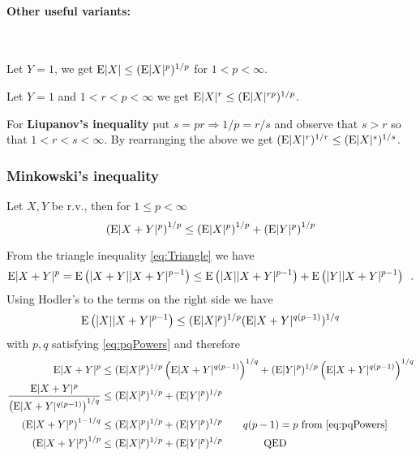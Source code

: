 \paragraph{Other useful variants:} \

Let $Y = 1$, we get $\mathrm{E} |X| \leq (\mathrm{E} |X|^p)^{1/p}$ for $1 < p < \infty$.

Let $Y = 1$ and $1 < r < p < \infty$ we get $\mathrm{E} |X|^r \leq (\mathrm{E} |X|^{rp})^{1/p}$.

For \textbf{Liupanov's inequality} put
$s = pr \Rightarrow 1/p = r/s$ and observe that $s > r$ so that
$1 < r < s < \infty$.
By rearranging the above we get $(\mathrm{E} |X|^r)^{1/r} \leq (\mathrm{E} |X|^{s})^{1/s}$.

\subsubsection{Minkowski's inequality}\label{sec:Minkowski}

Let $X, Y$ be r.v., then for $1 \leq p < \infty$
\begin{equation}\label{eq:Minkowski}
\left(\mathrm{E} |X+Y|^p\right)^{1/p} \leq \left(\mathrm{E} |X|^p\right)^{1/p} + \left(\mathrm{E} |Y|^p\right)^{1/p}
\end{equation}

\begin{prf}
From the triangle inequality \eqref{eq:Triangle} we have
\begin{equation*}
\mathrm{E} |X+Y|^p = \mathrm{E}\left(|X+Y| |X+Y|^{p-1}\right) \leq \mathrm{E}\left(|X| |X+Y|^{p-1}\right) + \mathrm{E}\left(|Y| |X+Y|^{p-1}\right) \enspace .
\end{equation*}
Using Hodler's to the terms on the right side we have
\begin{equation*}
\mathrm{E}\left(|X| |X+Y|^{p-1}\right) \leq (\mathrm{E} |X|^p)^{1/p} (\mathrm{E} |X+Y|^{q(p-1)})^{1/q}
\end{equation*}
with $p,q$ satisfying \eqref{eq:pqPowers} and therefore
\begin{align*}
\mathrm{E} |X+Y|^p & \leq (\mathrm{E} |X|^p)^{1/p} \left(\mathrm{E} |X+Y|^{q(p-1)}\right)^{1/q} + (\mathrm{E} |Y|^p)^{1/p} \left(\mathrm{E} |X+Y|^{q(p-1)}\right)^{1/q} \\
\frac{\mathrm{E} |X+Y|^p}{\left(\mathrm{E} |X+Y|^{q(p-1)}\right)^{1/q}}
& \leq (\mathrm{E} |X|^p)^{1/p} + (\mathrm{E} |Y|^p)^{1/p} \\
\left(\mathrm{E} |X+Y|^{p}\right)^{1 - 1/q}
& \leq (\mathrm{E} |X|^p)^{1/p} + (\mathrm{E} |Y|^p)^{1/p} \qquad q(p-1) = p \text{ from \eqref{eq:pqPowers}} \\
\left(\mathrm{E} |X+Y|^{p}\right)^{1/p}
& \leq (\mathrm{E} |X|^p)^{1/p} + (\mathrm{E} |Y|^p)^{1/p} \qquad \qquad \text{QED}
\end{align*}
\end{prf}

